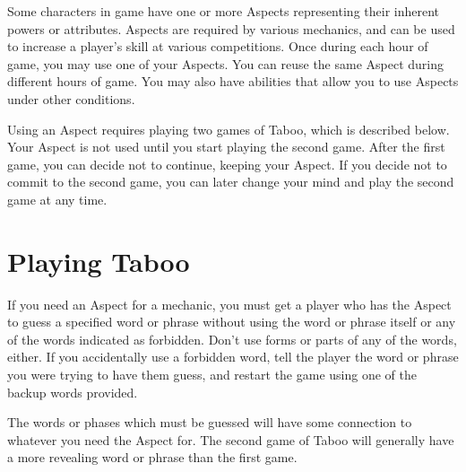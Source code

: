 \documentclass[green]{guardians}
\begin{document}
\name{\gAspect{}}

Some characters in game have one or more Aspects representing their inherent powers or attributes. Aspects are required by various mechanics, and can be used to increase a player's skill at various competitions. Once during each hour of game, you may use one of your Aspects. You can reuse the same Aspect during different hours of game. You may also have abilities that allow you to use Aspects under other conditions.



Using an Aspect requires playing two games of Taboo, which is described below. Your Aspect is not used until you start playing the second game. After the first game, you can decide not to continue, keeping your Aspect. If you decide not to commit to the second game, you can later change your mind and play the second game at any time.


\section*{Playing Taboo}

If you need an Aspect for a mechanic, you must get a player who has the Aspect to guess a specified word or phrase without using the word or phrase itself or any of the words indicated as forbidden. Don't use forms or parts of any of the words, either. If you accidentally use a forbidden word, tell the player the word or phrase you were trying to have them guess, and restart the game using one of the backup words provided.

The words or phases which must be guessed will have some connection to whatever you need the Aspect for. The second game of Taboo will generally have a more revealing word or phrase than the first game.

\end{document}
